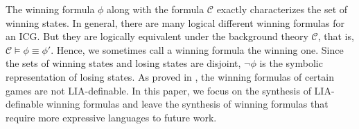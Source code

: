 \documentclass[review]{elsarticle}
\newcommand{\constraint}{\mathcal{C}}
\newcommand{\largestInt}[1][]{\lfloor#1\rfloor}
\begin{document}
	The winning formula $\phi$ along with the formula $\constraint$ exactly characterizes the set of winning states.
	In general, there are many logical different winning formulas for an ICG.
	But they are logically equivalent under the background theory $\constraint$, that is, $\constraint \models \phi \equiv \phi'$.
	Hence, we sometimes call a winning formula the winning one.
	Since the sets of winning states and losing states are disjoint, $\neg \phi$ is the symbolic representation of losing states.
	As proved in \cite{Fra2011}, the winning formulas of certain games are not LIA-definable.
	In this paper, we focus on the synthesis of LIA-definable winning formulas and leave the synthesis of winning formulas that require more expressive languages to future work.
	    
\end{document}
